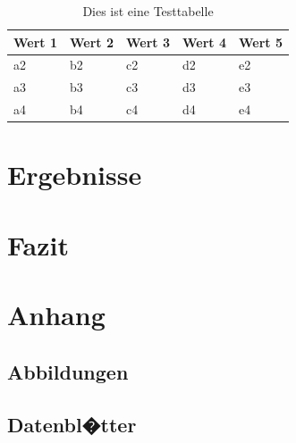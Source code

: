 \documentclass[
						a4paper,					%
						9.5pt,						%
	                    twocolumn				%
]{article}											%
\begin{document}
\begin{table}[H]
\centering
\begin{tabular}{l|l|l|l|l}
Wert 1 & Wert 2 & Wert 3 & Wert 4 & Wert 5  \\ 
\hline
a2     & b2     & c2     & d2     & e2      \\
a3     & b3     & c3     & d3     & e3      \\
a4     & b4     & c4     & d4     & e4     
\end{tabular}
\caption{Dies ist eine Testtabelle}
\end{table}




\section{Ergebnisse}




\section{Fazit}

	


\renewcommand{\bibname}{Literaturverzeichnis}
\printbibliography


\cleardoublepage %




\listoffigures


\listoftables


\cleardoublepage %

\onecolumn %
\section{Anhang}

\subsection{Abbildungen}




\subsection{Datenbl�tter}
\end{document}
